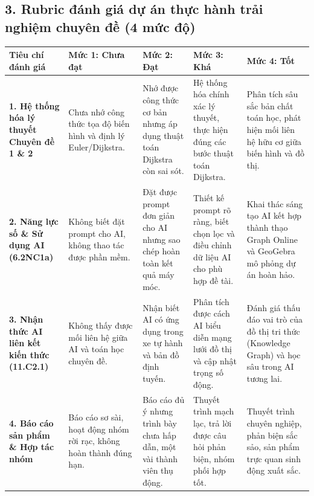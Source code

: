 \documentclass[12pt, a4paper]{article}
\begin{document}
\subsection*{3. Rubric đánh giá dự án thực hành trải nghiệm chuyên đề (4 mức độ)}

\begin{center}
\small
\begin{tabularx}{\linewidth}{|p{3cm}|X|X|X|X|}
\hline
\textbf{Tiêu chí đánh giá} & \textbf{Mức 1: Chưa đạt} & \textbf{Mức 2: Đạt} & \textbf{Mức 3: Khá} & \textbf{Mức 4: Tốt} \\ \hline
\textbf{1. Hệ thống hóa lý thuyết Chuyên đề 1 \& 2} & Chưa nhớ công thức tọa độ biến hình và định lý Euler/Dijkstra. & Nhớ được công thức cơ bản nhưng áp dụng thuật toán Dijkstra còn sai sót. & Hệ thống hóa chính xác lý thuyết, thực hiện đúng các bước thuật toán Dijkstra. & Phân tích sâu sắc bản chất toán học, phát hiện mối liên hệ hữu cơ giữa biến hình và đồ thị. \\ \hline
\textbf{2. Năng lực số \& Sử dụng AI (6.2NC1a)} & Không biết đặt prompt cho AI, không thao tác được phần mềm. & Đặt được prompt đơn giản cho AI nhưng sao chép hoàn toàn kết quả máy móc. & Thiết kế prompt rõ ràng, biết chọn lọc và điều chỉnh dữ liệu AI cho phù hợp đề tài. & Khai thác sáng tạo AI kết hợp thành thạo Graph Online và GeoGebra mô phỏng dự án hoàn hảo. \\ \hline
\textbf{3. Nhận thức AI liên kết kiến thức (11.C2.1)} & Không thấy được mối liên hệ giữa AI và toán học chuyên đề. & Nhận biết AI có ứng dụng trong xe tự hành và bản đồ định tuyến. & Phân tích được cách AI biểu diễn mạng lưới đồ thị và cập nhật trọng số động. & Đánh giá thấu đáo vai trò của đồ thị tri thức (Knowledge Graph) và học sâu trong AI tương lai. \\ \hline
\textbf{4. Báo cáo sản phẩm \& Hợp tác nhóm} & Báo cáo sơ sài, hoạt động nhóm rời rạc, không hoàn thành đúng hạn. & Báo cáo đủ ý nhưng trình bày chưa hấp dẫn, một vài thành viên thụ động. & Thuyết trình mạch lạc, trả lời được câu hỏi phản biện, nhóm phối hợp tốt. & Thuyết trình chuyên nghiệp, phản biện sắc sảo, sản phẩm trực quan sinh động xuất sắc. \\ \hline
\end{tabularx}
\end{center}
\end{document}
